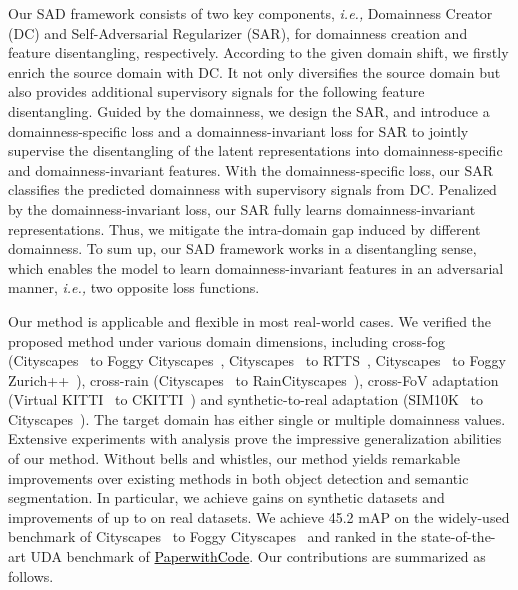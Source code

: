 \documentclass[10pt,journal,compsoc]{IEEEtran}
\begin{document}
Our SAD framework consists of two key components, \emph{i.e.,} Domainness Creator (DC) and Self-Adversarial Regularizer (SAR), for domainness creation and feature disentangling, respectively.  
According to the given domain shift, we firstly enrich the source domain with DC.
It not only diversifies the source domain  but also provides additional supervisory signals for the following feature  disentangling. 
Guided by the domainness, we design the SAR, and introduce a domainness-specific loss and a domainness-invariant loss for SAR to jointly supervise the disentangling of the latent representations into
domainness-specific and domainness-invariant features. 
With the domainness-specific loss, our SAR classifies the predicted domainness with supervisory signals from DC. Penalized by the domainness-invariant loss, our SAR fully learns domainness-invariant representations. Thus, we mitigate the intra-domain gap induced by different domainness. 
 To sum up, our SAD framework works in a disentangling sense, which enables the model to learn domainness-invariant features in an adversarial manner, \emph{i.e.,} two opposite loss functions. 


 Our method is applicable and flexible in most real-world cases. We verified the proposed method under various domain dimensions, including cross-fog (Cityscapes~\cite{cordts2016cityscapes} to Foggy Cityscapes~\cite{FoggyCity}, Cityscapes~\cite{cordts2016cityscapes} to RTTS~\cite{RTTS}, Cityscapes~\cite{cordts2016cityscapes} to Foggy Zurich++~\cite{FoggyDriving,FoggyCity}), cross-rain (Cityscapes~\cite{cordts2016cityscapes} to RainCityscapes~\cite{rainy_city}), cross-FoV adaptation (Virtual KITTI~\cite{VKITTI} to CKITTI~\cite{kITTI,cordts2016cityscapes}) and synthetic-to-real adaptation (SIM10K~\cite{sim10k} to Cityscapes~\cite{cordts2016cityscapes}). The target domain has either single or multiple domainness values.  Extensive experiments with analysis prove the impressive generalization abilities of our method.  Without bells and whistles, our method yields remarkable improvements over existing methods in both object detection and semantic segmentation. In particular, we achieve  gains on synthetic datasets and improvements of up to  on real datasets.   We achieve 45.2 mAP on the widely-used benchmark of Cityscapes~\cite{cordts2016cityscapes} to Foggy Cityscapes~\cite{FoggyCity} and ranked  in the state-of-the-art UDA benchmark of \href{https://paperswithcode.com/sota/unsupervised-domain-adaptation-on-cityscapes-1}{\textcolor{black}{PaperwithCode}}. Our contributions are summarized as follows. 
\end{document}
